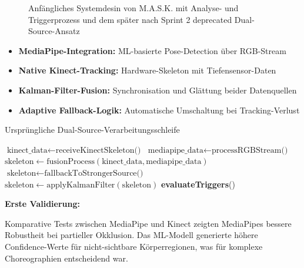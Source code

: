 \begin{figure}[htbp]
{    }
    \caption{Anfängliches Systemdesin von M.A.S.K. mit Analyse- und Triggerprozess und dem später nach Sprint 2 deprecated Dual-Source-Ansatz}
    \label{fig:mask_architecture}
\end{figure}
\begin{itemize}
    \item \textbf{MediaPipe-Integration:} ML-basierte Pose-Detection über RGB-Stream
    \item \textbf{Native Kinect-Tracking:} Hardware-Skeleton mit Tiefensensor-Daten
    \item \textbf{Kalman-Filter-Fusion:} Synchronisation und Glättung beider Datenquellen
    \item \textbf{Adaptive Fallback-Logik:} Automatische Umschaltung bei Tracking-Verlust
\end{itemize}

\begin{algorithm}[H]
\caption{Ursprüngliche Dual-Source-Verarbeitungsschleife}
\begin{algorithmic}[1]
    \State $\text{kinect\_data} \leftarrow \text{receiveKinectSkeleton()}$
    \State $\text{mediapipe\_data} \leftarrow \text{processRGBStream()}$
        \State $\text{skeleton} \leftarrow \text{fusionProcess}(\text{kinect\_data}, \text{mediapipe\_data})$
    \Else
        \State $\text{skeleton} \leftarrow \text{fallbackToStrongerSource()}$
    \EndIf
    \State $\text{skeleton} \leftarrow \text{applyKalmanFilter}(\text{skeleton})$
    \State \textbf{evaluateTriggers}()
\end{algorithmic}
\end{algorithm}

\textbf{Erste Validierung:}
\raggedright Komparative Tests zwischen MediaPipe und Kinect zeigten MediaPipes bessere Robustheit bei partieller Okklusion. Das ML-Modell generierte höhere Confidence-Werte für nicht-sichtbare Körperregionen, was für komplexe Choreographien entscheidend war.

